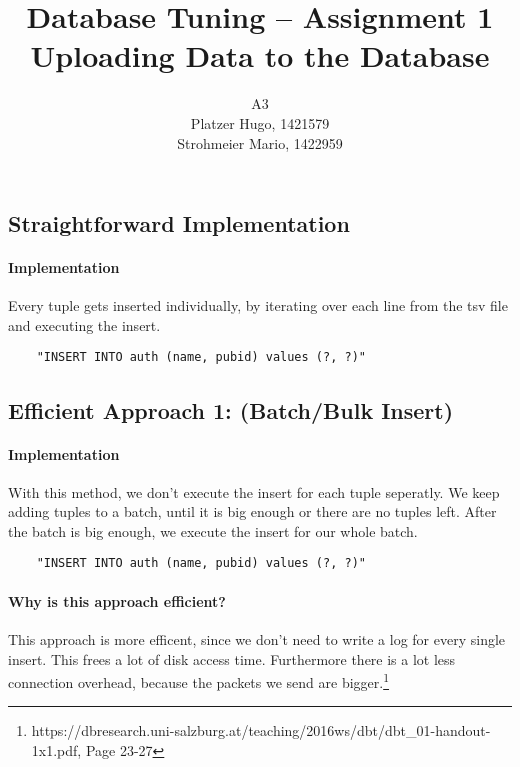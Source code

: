 \documentclass[11pt]{scrartcl}
\title{
  \textbf{\large Database Tuning -- Assignment 1}\\
  Uploading Data to the Database
}
\author{
 A3\\
 \large Platzer Hugo, 1421579 \\
 \large Strohmeier Mario, 1422959 \\
}
\begin{document}
\maketitle

\subsection*{Straightforward Implementation}

  \paragraph{Implementation}

  Every tuple gets inserted individually, by iterating over each line from the tsv file and executing the insert.

{\small
\begin{verbatim}
    "INSERT INTO auth (name, pubid) values (?, ?)"
\end{verbatim}
}

  \subsection*{Efficient Approach 1: (Batch/Bulk Insert)}

  \paragraph{Implementation}

  With this method, we don't execute the insert for each tuple seperatly. We keep adding tuples to a batch, until it is big enough or there are no tuples left. After the batch is big enough, we execute the insert for our whole batch.


{\small
\begin{verbatim}
    "INSERT INTO auth (name, pubid) values (?, ?)"
\end{verbatim}
}

  \paragraph{Why is this approach efficient?}

  This approach is more efficent, since we don't need to write a log for every single insert. This frees a lot of disk access time. Furthermore there is a lot less connection overhead, because the packets we send are bigger.\footnote{https://dbresearch.uni-salzburg.at/teaching/2016ws/dbt/dbt_01-handout-1x1.pdf, Page 23-27}
\end{document}
